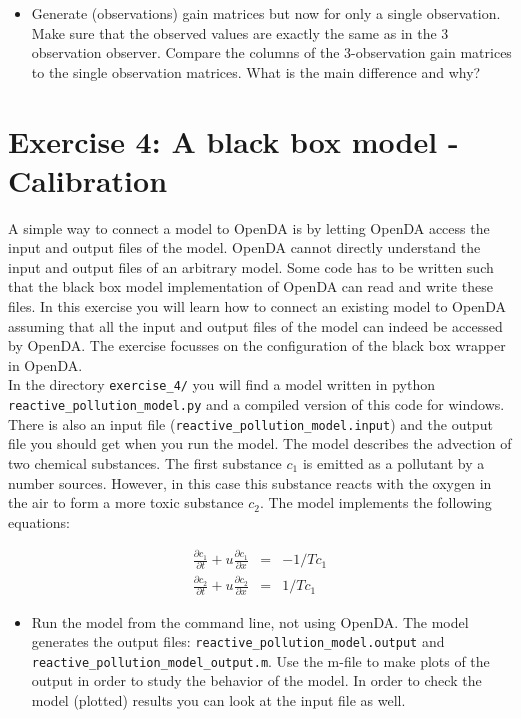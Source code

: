 \documentclass[a4paper,10pt]{article}
\begin{document}
\begin{itemize}
\item Generate (observations) gain matrices but now for only a single
  observation. Make sure that the observed values are exactly the same as in
  the 3 observation observer. Compare the columns of the 3-observation gain
  matrices to the single observation matrices. What is the main difference and
  why?
\end{itemize}

\section{Exercise 4: A black box model - Calibration}

A simple way to connect a model to OpenDA is by letting OpenDA access the input
and output files of the model. OpenDA cannot directly understand the input and
output files of an arbitrary model. Some code has to be written such that the
black box model implementation of OpenDA can read and write these files. In
this exercise you will learn how to connect an existing model to OpenDA
assuming that all the input and output files of the model can indeed be
accessed by OpenDA. The exercise focusses on the configuration of the black box
wrapper in OpenDA.\\

In the directory {\tt exercise\_4/} you will find a model written in python \\
{\tt reactive\_pollution\_model.py} and a compiled version of this code for
windows. There is also an input file ({\tt reactive\_pollution\_model.input})
and the output file you should get when you run the model. The model describes
the advection of two chemical substances. The first substance $c_1$ is emitted
as a pollutant by a number sources. However, in this case this substance reacts
with the oxygen in the air to form a more toxic substance $c_2$. The model
implements the following equations:

\begin{eqnarray}
    \frac{\partial c_1}{\partial t} + u\frac{\partial c_1}{\partial x} & = & -
    1/T c_1 \\
    \frac{\partial c_2}{\partial t} + u\frac{\partial c_2}{\partial x} & = &
    1/T c_1
\end{eqnarray}

\begin{itemize}
\item Run the model from the command line, not using OpenDA. The model
  generates the output files: {\tt reactive\_pollution\_model.output} and
  \\ {\tt reactive\_pollution\_model\_output.m}. Use the m-file to make plots
  of the output in order to study the behavior of the model. In order to check
  the model (plotted) results you can look at the input file as well.
\end{itemize}
\end{document}

